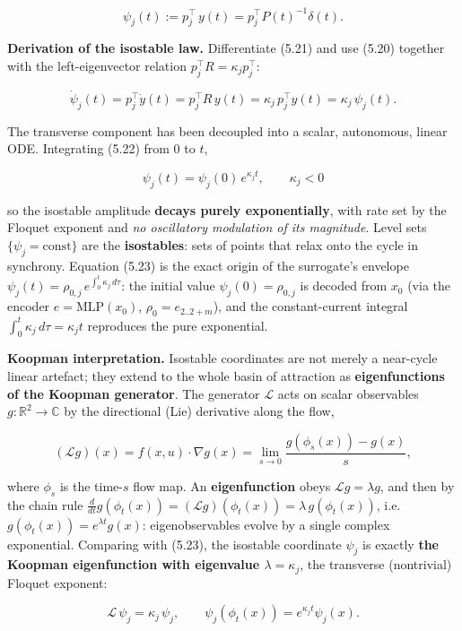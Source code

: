\documentclass[
  11pt,
]{article}
\providecommand{\lt}{<}
\begin{document}
\[
\psi_j(t):=p_j^\top\,y(t)=p_j^\top P(t)^{-1}\delta(t).
\tag{5.21}
\]

\textbf{Derivation of the isostable law.} Differentiate (5.21) and use
(5.20) together with the left-eigenvector relation
\(p_j^\top R=\kappa_j p_j^\top\):

\[
\dot\psi_j(t)=p_j^\top\dot y(t)=p_j^\top R\,y(t)=\kappa_j\,p_j^\top y(t)=\kappa_j\,\psi_j(t).
\tag{5.22}
\]

The transverse component has been decoupled into a scalar, autonomous,
linear ODE. Integrating (5.22) from \(0\) to \(t\),

\[
\boxed{\;\psi_j(t)=\psi_j(0)\,e^{\kappa_j t},\qquad \kappa_j\lt 0\;}
\tag{5.23}
\]

so the isostable amplitude \textbf{decays purely exponentially}, with
rate set by the Floquet exponent and \emph{no oscillatory modulation of
its magnitude}. Level sets \(\{\psi_j=\text{const}\}\) are the
\textbf{isostables}: sets of points that relax onto the cycle in
synchrony. Equation (5.23) is the exact origin of the surrogate's
envelope \(\psi_j(t)=\rho_{0,j}\,e^{\int_0^t\kappa_j\,d\tau}\): the
initial value \(\psi_j(0)=\rho_{0,j}\) is decoded from \(x_0\) (via the
encoder \(e=\mathrm{MLP}(x_0)\), \(\rho_0=e_{2..2+m}\)), and the
constant-current integral \(\int_0^t\kappa_j\,d\tau=\kappa_j t\)
reproduces the pure exponential.

\textbf{Koopman interpretation.} Isostable coordinates are not merely a
near-cycle linear artefact; they extend to the whole basin of attraction
as \textbf{eigenfunctions of the Koopman generator}. The generator
\(\mathcal L\) acts on scalar observables
\(g:\mathbb{R}^2\to\mathbb{C}\) by the directional (Lie) derivative
along the flow,

\[
(\mathcal L g)(x)=f(x,u)\cdot\nabla g(x)=\lim_{s\to0}\frac{g(\phi_s(x))-g(x)}{s},
\]

where \(\phi_s\) is the time-\(s\) flow map. An \textbf{eigenfunction}
obeys \(\mathcal L g=\lambda g\), and then by the chain rule
\(\tfrac{d}{dt}g(\phi_t(x))=(\mathcal L g)(\phi_t(x))=\lambda\,g(\phi_t(x))\),
i.e.~\(g(\phi_t(x))=e^{\lambda t}g(x)\): eigenobservables evolve by a
single complex exponential. Comparing with (5.23), the isostable
coordinate \(\psi_j\) is exactly \textbf{the Koopman eigenfunction with
eigenvalue \(\lambda=\kappa_j\)}, the transverse (nontrivial) Floquet
exponent:

\[
\mathcal L\,\psi_j=\kappa_j\,\psi_j,\qquad \psi_j(\phi_t(x))=e^{\kappa_j t}\psi_j(x).
\tag{5.24}
\]
\end{document}
